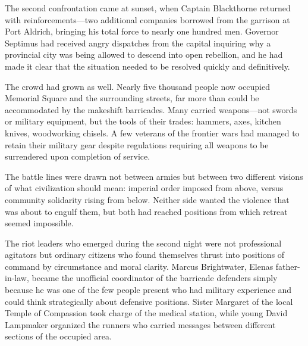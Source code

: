 The second confrontation came at sunset, when Captain Blackthorne
returned with reinforcements---two additional companies borrowed from
the garrison at Port Aldrich, bringing his total force to nearly one
hundred men. Governor Septimus had received angry dispatches from the
capital inquiring why a provincial city was being allowed to descend
into open rebellion, and he had made it clear that the situation needed
to be resolved quickly and definitively.

The crowd had grown as well. Nearly five thousand people now occupied
Memorial Square and the surrounding streets, far more than could be
accommodated by the makeshift barricades. Many carried weapons---not
swords or military equipment, but the tools of their trades: hammers,
axes, kitchen knives, woodworking chisels. A few veterans of the
frontier wars had managed to retain their military gear despite
regulations requiring all weapons to be surrendered upon completion of
service.

The battle lines were drawn not between armies but between two different
visions of what civilization should mean: imperial order imposed from
above, versus community solidarity rising from below. Neither side
wanted the violence that was about to engulf them, but both had reached
positions from which retreat seemed impossible.

The riot leaders who emerged during the second night were not
professional agitators but ordinary citizens who found themselves thrust
into positions of command by circumstance and moral clarity. Marcus
Brightwater, Elena\textquotesingle s father-in-law, became the
unofficial coordinator of the barricade defenders simply because he was
one of the few people present who had military experience and could
think strategically about defensive positions. Sister Margaret of the
local Temple of Compassion took charge of the medical station, while
young David Lampmaker organized the runners who carried messages between
different sections of the occupied area.

